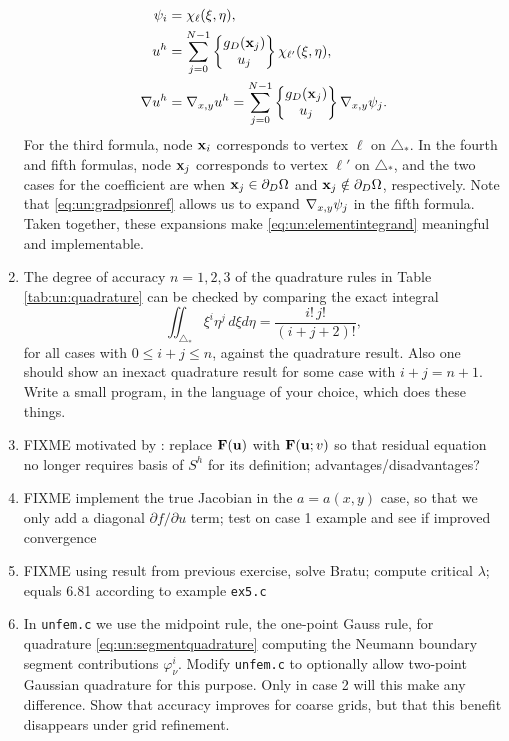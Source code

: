 \begin{enumerate}
\begin{align*}
\psi_i &= \chi_{\ell}(\xi,\eta), \\
u^h &= \sum_{j=0}^{N-1} \left\{\begin{matrix} g_D(\mathbf{x}_j) \\ u_j \end{matrix}\right\} \chi_{\ell'}(\xi,\eta), \\
\nabla u^h &= \nabla_{x,y} u^h = \sum_{j=0}^{N-1} \left\{\begin{matrix} g_D(\mathbf{x}_j) \\ u_j \end{matrix}\right\} \nabla_{x,y} \psi_j.
\end{align*}
For the third formula, node $\mathbf{x}_i$ corresponds to vertex $\ell$ on $\triangle_\ast$.  In the fourth and fifth formulas, node $\mathbf{x}_j$ corresponds to vertex $\ell'$ on $\triangle_\ast$, and the two cases for the coefficient are when $\mathbf{x}_j \in \partial_D \Omega$ and $\mathbf{x}_j \notin \partial_D \Omega$, respectively.  Note that \eqref{eq:un:gradpsionref} allows us to expand $\nabla_{x,y} \psi_j$ in the fifth formula.  Taken together, these expansions make \eqref{eq:un:elementintegrand} meaningful and implementable.
\item  \label{exer:un:checkquadrature}  The degree of accuracy $n=1,2,3$ of the quadrature rules in Table \ref{tab:un:quadrature} can be checked by comparing the exact integral
\begin{equation}
\iint_{\triangle_\ast} \xi^i \eta^j\,d\xi d\eta = \frac{i!\,j!}{(i+j+2)!}, \label{eq:un:checkquadrature}
\end{equation}
for all cases with $0\le i+j\le n$, against the quadrature result.  Also one should show an inexact quadrature result for some case with $i+j=n+1$.  Write a small program, in the language of your choice, which does these things.
\item \label{exer:un:basisfreeresidual} FIXME motivated by \citep{Loggetal2012}: replace $\mathbf{F}(\mathbf{u})$ with $\mathbf{F}(\mathbf{u};v)$ so that residual equation no longer requires basis of $S^h$ for its definition; advantages/disadvantages?
\item \label{exer:un:truejacobian} FIXME implement the true Jacobian in the $a=a(x,y)$ case, so that we only add a diagonal $\partial f/\partial u$ term; test on case 1 example and see if improved \pSNES convergence
\item \label{exer:un:bratu} FIXME using result from previous exercise, solve Bratu; compute critical $\lambda$; equals 6.81 according to \pSNES example \texttt{ex5.c}
\item \label{exer:un:gaussneumann}  In \texttt{unfem.c} we use the midpoint rule, the one-point Gauss rule, for quadrature \eqref{eq:un:segmentquadrature} computing the Neumann boundary segment contributions $\varphi_\nu^i$.  Modify \texttt{unfem.c} to optionally allow two-point Gaussian quadrature for this purpose.  Only in case 2 will this make any difference.  Show that accuracy improves for coarse grids, but that this benefit disappears under grid refinement.
\end{enumerate}

